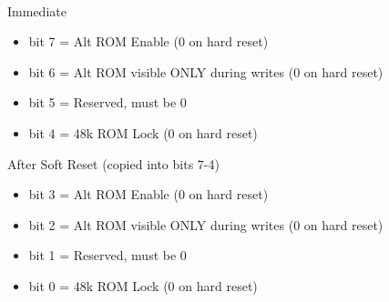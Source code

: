 \\
Immediate
\begin{itemize}
\item bit 7 = Alt ROM Enable (0 on hard reset)
\item bit 6 = Alt ROM visible ONLY during writes (0 on hard reset)
\item bit 5 = Reserved, must be 0
\item bit 4 = 48k ROM Lock (0 on hard reset)
\end{itemize}
After Soft Reset (copied into bits 7-4)
\begin{itemize}
\item bit 3 = Alt ROM Enable (0 on hard reset)
\item bit 2 = Alt ROM visible ONLY during writes (0 on hard reset)
\item bit 1 = Reserved, must be 0
\item bit 0 = 48k ROM Lock (0 on hard reset)
\end{itemize}


